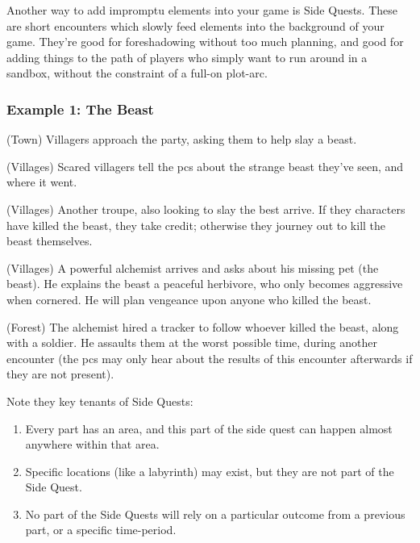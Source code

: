 \begin{multicols}{2}

\noindent
Another way to add impromptu elements into your game is Side Quests.
These are short encounters which slowly feed elements into the background of your game.
They're good for foreshadowing without too much planning, and good for adding things to the path of players who simply want to run around in a sandbox, without the constraint of a full-on plot-arc.

\subsubsection{Example 1: The Beast}

\begin{list}{\sqn}{}

  \item[\sqr]
  (Town) Villagers approach the party, asking them to help slay a beast.
  \item
  (Villages)
  Scared villagers tell the \glspl{pc} about the strange beast they've seen, and where it went.
  \item
  (Villages) Another troupe, also looking to slay the best arrive. If they characters have killed the beast, they take credit; otherwise they journey out to kill the beast themselves.
  \item
  (Villages)
  A powerful alchemist arrives and asks about his missing pet (the beast).
  He explains the beast a peaceful herbivore, who only becomes aggressive when cornered.
  He will plan vengeance upon anyone who killed the beast.
  \item
  (Forest) \squash
  The alchemist hired a tracker to follow whoever killed the beast, along with a soldier.
  He assaults them at the worst possible time, during another encounter (the \glspl{pc} may only hear about the results of this encounter afterwards if they are not present).

\end{list}

Note they key tenants of Side Quests:

\begin{enumerate}

  \item
  Every part has an area, and this part of the side quest can happen almost anywhere within that area.
  \item
  Specific locations (like a labyrinth) may exist, but they are not part of the Side Quest.
  \item
  No part of the Side Quests will rely on a particular outcome from a previous part, or a specific time-period.


\end{enumerate}
\end{multicols}
